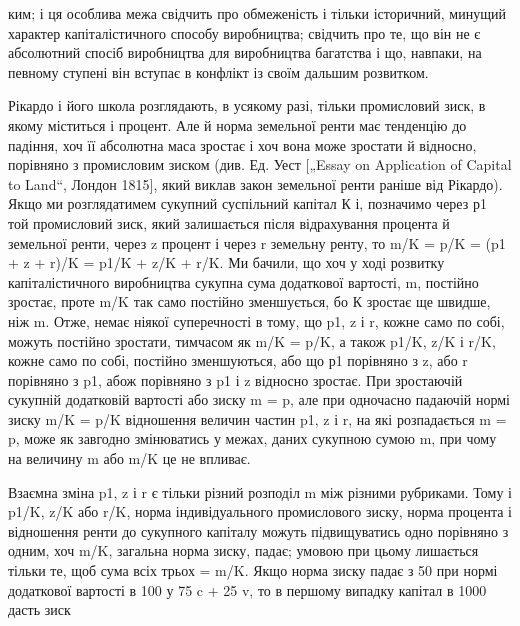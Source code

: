 ким; і ця особлива межа свідчить про обмеженість і тільки
історичний, минущий характер капіталістичного способу виробництва;
свідчить про те, що він не є абсолютний спосіб виробництва
для виробництва багатства і що, навпаки, на певному
ступені він вступає в конфлікт із своїм дальшим розвитком.

Рікардо і його школа розглядають, в усякому разі, тільки промисловий
зиск, в якому міститься і процент. Але й норма земельної
ренти має тенденцію до падіння, хоч її абсолютна маса зростає
і хоч вона може зростати й відносно, порівняно з промисловим
зиском (див. Ед. Уест [„Essay on Application of Capital to Land“,
Лондон 1815], який виклав закон земельної ренти раніше від
Рікардо). Якщо ми розглядатимем сукупний суспільний капітал
К і, позначимо через р1 той промисловий зиск, який залишається
після відрахування процента й земельної ренти, через z
процент і через r земельну ренту, то m/K = p/K = (p1 + z + r)/K =
p1/K + z/K + r/K. Ми бачили, що хоч у ході розвитку капіталістичного
виробництва сукупна сума додаткової вартості, m, постійно
зростає, проте m/K так само постійно зменшується, бо К
зростає ще швидше, ніж m. Отже, немає ніякої суперечності
в тому, що p1, z і r, кожне само по собі, можуть постійно зростати,
тимчасом як m/K = p/K, а також p1/K, z/K і r/K, кожне само
по собі, постійно зменшуються, або що р1 порівняно з z, або
r порівняно з p1, абож порівняно з p1 і z відносно зростає.
При зростаючій сукупній додатковій вартості або зиску m = p, але
при одночасно падаючій нормі зиску m/K = p/K відношення величин
частин p1, z і r, на які розпадається m = p, може як завгодно
змінюватись у межах, даних сукупною сумою m, при чому
на величину m або m/K це не впливає.

Взаємна зміна p1, z і r є тільки різний розподіл m між різними
рубриками. Тому і p1/K, z/K або r/K, норма індивідуального
промислового зиску, норма процента і відношення ренти до
сукупного капіталу можуть підвищуватись одно порівняно з одним,
хоч m/K, загальна норма зиску, падає; умовою при цьому
лишається тільки те, щоб сума всіх трьох = m/K. Якщо норма
зиску падає з 50%
при нормі додаткової вартості в 100%
у 75 c + 25 v, то в першому випадку капітал в 1000 дасть зиск
